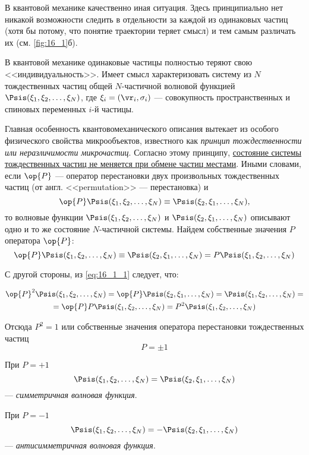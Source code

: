 В квантовой механике качественно иная ситуация. Здесь принципиально нет никакой возможности следить в отдельности за каждой из одинаковых частиц (хотя бы потому, что понятие траектории теряет смысл) и тем самым различать их (см. \autoref{fig:16_1}б).

В квантовой механике одинаковые частицы полностью теряют свою <<индивидуальность>>. Имеет смысл характеризовать систему из $N$ тождественных частиц общей $N$-частичной волновой функцией $\Psis(\xi_1, \xi_2, \dots, \xi_N )$, где $\xi_i = (\vr_i, \sigma_i)$ --- совокупность пространственных и спиновых переменных $i$-й частицы.

Главная особенность квантовомеханического описания вытекает из особого физического свойства микрообъектов, известного как {\em принцип тождественности или неразличимости микрочастиц}. Согласно этому принципу, \underline{состояние системы тождественных частиц не меняется при обмене частиц местами}. Иными словами, если $\op{P}$ --- оператор перестановки двух произвольных тождественных частиц (от англ. <<permutation>> --- перестановка) и
$$
\op{P} \Psis(\xi_1, \xi_2, \dots, \xi_N) \equiv \Psis(\xi_2, \xi_1, \dots, \xi_N),
$$
то волновые функции $\Psis(\xi_1, \xi_2, \dots, \xi_N)$ и $\Psis(\xi_2, \xi_1, \dots, \xi_N)$ описывают одно и то же состояние $N$-частичной системы. Найдем собственные значения $P$ оператора $\op{P}$:
\begin{equation}
\label{eq:16_1_1}
\op{P} \Psis(\xi_1, \xi_2, \dots, \xi_N) \equiv \Psis(\xi_2, \xi_1, \dots, \xi_N) = P \Psis(\xi_1, \xi_2, \dots, \xi_N)
\end{equation}

С другой стороны, из \eqref{eq:16_1_1} следует, что:

\begin{gather*}
\op{P}^2 \Psis(\xi_1, \xi_2, \dots, \xi_N) = \op{P}\Psis(\xi_2, \xi_1, \dots, \xi_N) = \Psis(\xi_1, \xi_2, \dots, \xi_N) = \\= \op{P} P\Psis(\xi_1, \xi_2, \dots, \xi_N) = P^2 \Psis(\xi_1, \xi_2, \dots, \xi_N)
\end{gather*}

Отсюда $P^2 = 1$ или собственные значения оператора перестановки тождественных частиц 
$$\boxed{P = \pm 1}$$

При $P = +1$
$$
\Psis(\xi_1, \xi_2, \dots, \xi_N) = \Psis(\xi_2, \xi_1, \dots, \xi_N)
$$
--- {\em симметричная волновая функция}.

При $P = -1$
$$
\Psis(\xi_1, \xi_2, \dots, \xi_N) = -\Psis(\xi_2, \xi_1, \dots, \xi_N)
$$ 
--- {\em антисимметричная волновая функция}.

